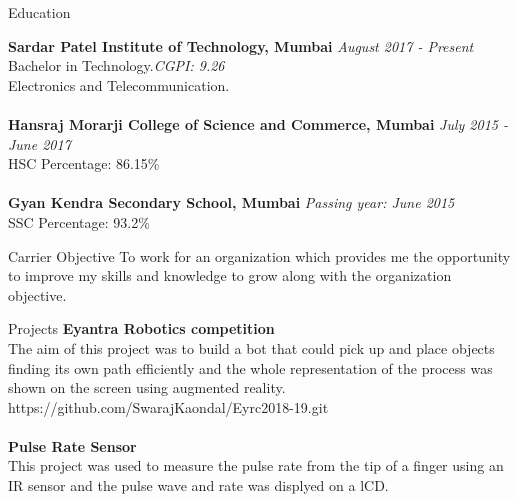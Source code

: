 \documentclass{resume} %
\begin{document}

\begin{rSection}{Education}

{\bf Sardar Patel Institute of Technology, Mumbai} \hfill {\em August 2017 - Present} 
\\ Bachelor in Technology.\hfill {\em CGPI: 9.26}
\\ Electronics and Telecommunication.\\
\\{\bf Hansraj Morarji College of Science and Commerce, Mumbai} \hfill {\em July 2015 - June 2017} 
\\ HSC\hfill { Percentage: 86.15\% }
\\
\\{\bf Gyan Kendra Secondary School, Mumbai} \hfill {\em Passing year: June 2015} 
\\ SSC\hfill { Percentage: 93.2\% }


\end{rSection}

\begin{rSection}{Carrier Objective}
 To work for an organization which provides me the opportunity to improve my skills and knowledge to grow along with the organization objective.
\end{rSection}
\begin{rSection}{Projects}
{\bf Eyantra Robotics competition}
\\The aim of this project was to build a bot that could pick up and place objects finding its own path efficiently and the whole representation of the process was shown on the screen using augmented reality.\\https://github.com/SwarajKaondal/Eyrc2018-19.git\\
\\{\bf Pulse Rate Sensor}\\
This project was used to measure the pulse rate from the tip of a finger using an IR sensor and the pulse wave and rate was displyed on a lCD.\\

\end{rSection}
\end{document}
